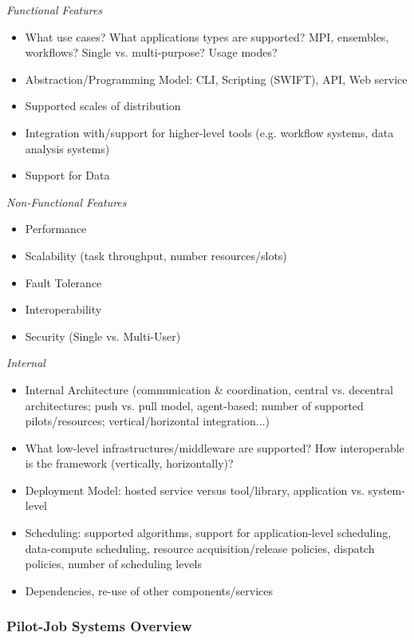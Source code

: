 \documentclass{sig-alternate}
\begin{document}
\noindent
\emph{Functional Features}
\begin{itemize}
	\item What use cases? What applications types are supported? MPI, 
	ensembles, workflows? Single vs. multi-purpose? Usage modes?
	\item Abstraction/Programming Model: CLI, Scripting (SWIFT), API, Web 
	service
	\item Supported scales of distribution
	\item Integration with/support for higher-level tools (e.g. workflow 
	systems, data analysis systems)		
	\item Support for Data
\end{itemize}
\emph{Non-Functional Features}
\begin{itemize}
	\item Performance 
	\item Scalability (task throughput, number resources/slots)
	\item Fault Tolerance
	\item Interoperability
	\item Security (Single vs. Multi-User)
\end{itemize}
\emph{Internal}
\begin{itemize}
	\item Internal Architecture (communication \& coordination, central 
	vs. decentral architectures; push vs. pull model, agent-based; number 
	of supported pilots/resources; vertical/horizontal integration...)
	\item What low-level infrastructures/middleware are supported? How 
	interoperable is the framework (vertically, horizontally)?
	\item Deployment Model: hosted service versus tool/library, 
	application vs. system-level
	\item Scheduling: supported algorithms, support for application-level 
	scheduling, data-compute scheduling, resource acquisition/release 
	policies, dispatch policies, number of scheduling levels	
	\item Dependencies, re-use of other components/services	
\end{itemize}		



\subsubsection{Pilot-Job Systems Overview}
\end{document}

